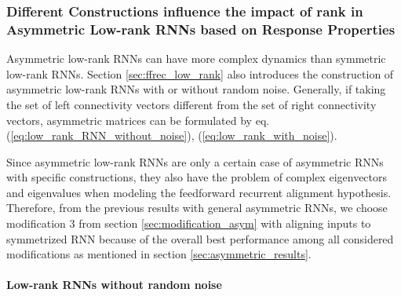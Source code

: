 \documentclass[11pt]{article}
\begin{document}
	\subsubsection{Different Constructions influence the impact of rank in Asymmetric Low-rank RNNs based on Response Properties}
	
	Asymmetric low-rank RNNs can have more complex dynamics than symmetric low-rank RNNs. Section \ref{sec:ffrec_low_rank} also introduces the construction of asymmetric low-rank RNNs with or without random noise. Generally, if taking the set of left connectivity vectors different from the set of right connectivity vectors, asymmetric matrices can be formulated by eq.(\ref{eq:low_rank_RNN_without_noise}), (\ref{eq:low_rank_with_noise}). 
	
	Since asymmetric low-rank RNNs are only a certain case of asymmetric RNNs with specific constructions, they also have the problem of complex eigenvectors and eigenvalues when modeling the feedforward recurrent alignment hypothesis. Therefore, from the previous results with general asymmetric RNNs, we choose modification 3 from section \ref{sec:modification_asym} with aligning inputs to symmetrized RNN because of the overall best performance among all considered modifications as mentioned in section \ref{sec:asymmetric_results}.
	\vspace{0.7cm}
	\paragraph{Low-rank RNNs without random noise}
	
\end{document}
